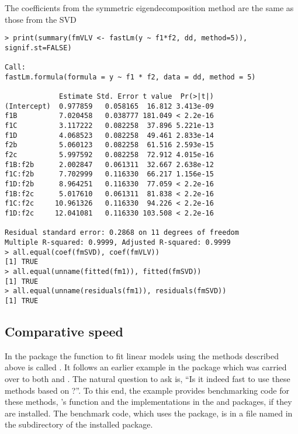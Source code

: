\documentclass[shortnames,article]{jss}
\begin{document}
The coefficients from the symmetric eigendecomposition method are the same as those from the SVD

\begin{verbatim}
> print(summary(fmVLV <- fastLm(y ~ f1*f2, dd, method=5)), signif.st=FALSE)

Call:
fastLm.formula(formula = y ~ f1 * f2, data = dd, method = 5)

             Estimate Std. Error t value  Pr(>|t|)
(Intercept)  0.977859   0.058165  16.812 3.413e-09
f1B          7.020458   0.038777 181.049 < 2.2e-16
f1C          3.117222   0.082258  37.896 5.221e-13
f1D          4.068523   0.082258  49.461 2.833e-14
f2b          5.060123   0.082258  61.516 2.593e-15
f2c          5.997592   0.082258  72.912 4.015e-16
f1B:f2b      2.002847   0.061311  32.667 2.638e-12
f1C:f2b      7.702999   0.116330  66.217 1.156e-15
f1D:f2b      8.964251   0.116330  77.059 < 2.2e-16
f1B:f2c      5.017610   0.061311  81.838 < 2.2e-16
f1C:f2c     10.961326   0.116330  94.226 < 2.2e-16
f1D:f2c     12.041081   0.116330 103.508 < 2.2e-16

Residual standard error: 0.2868 on 11 degrees of freedom
Multiple R-squared: 0.9999,	Adjusted R-squared: 0.9999
> all.equal(coef(fmSVD), coef(fmVLV))
[1] TRUE
> all.equal(unname(fitted(fm1)), fitted(fmSVD))
[1] TRUE
> all.equal(unname(residuals(fm1)), residuals(fmSVD))
[1] TRUE
\end{verbatim}

\subsection{Comparative speed}

In the  package the  function to fit linear
models using the methods described above is called . It follows
an earlier example in the  package which was carried over to both
 and . The natural question to ask is, ``Is it indeed fast to use these methods
based on ?''.  To this end, the example provides benchmarking code for these
methods, 's  function and the 
implementations in the  \citep{CRAN:RcppArmadillo}
and  \citep{CRAN:RcppGSL} packages, if they are
installed.  The benchmark code, which uses the 
\citep{CRAN:rbenchmark} package, is in a file named
 in the  subdirectory of the
installed  package.
\end{document}

